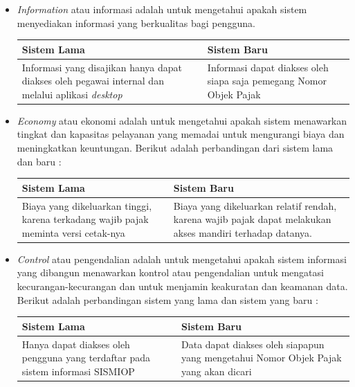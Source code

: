 \documentclass[pdftex,12pt, oneside]{article}
\begin{document}
\begin{enumerate}
\begin{itemize}
\item \textit{Information} atau informasi adalah untuk mengetahui apakah sistem menyediakan informasi yang berkualitas bagi pengguna. 

\begin{table}
	\centering
	\begin{tabular}{| p{7cm} | p{7cm} |}
		\hline
		Sistem Lama & Sistem Baru \\
		\hline
		Informasi yang disajikan hanya dapat diakses oleh pegawai internal dan melalui aplikasi \textit{desktop} & Informasi dapat diakses oleh siapa saja pemegang Nomor Objek Pajak \\
		\hline
	\end{tabular}
\end{table}

\item \textit{Economy} atau ekonomi adalah untuk mengetahui apakah sistem menawarkan tingkat dan kapasitas pelayanan yang memadai untuk mengurangi biaya dan meningkatkan keuntungan. Berikut adalah perbandingan dari sistem lama dan baru :

\begin{table}	
	\centering
	\begin{tabular}{| p{7cm} | p{7cm} |}
		\hline 
		Sistem Lama & Sistem Baru \\
		\hline
		Biaya yang dikeluarkan tinggi, karena terkadang wajib pajak meminta versi cetak-nya & Biaya yang dikeluarkan relatif rendah, karena wajib pajak dapat melakukan akses mandiri terhadap datanya. \\
		\hline		
	\end{tabular}
\end{table}

\item \textit{Control} atau pengendalian adalah untuk mengetahui apakah sistem informasi yang dibangun menawarkan kontrol atau pengendalian untuk mengatasi kecurangan-kecurangan dan untuk menjamin keakuratan dan keamanan data. Berikut adalah perbandingan sistem yang lama dan sistem yang baru :

\begin{table}[H]
	\centering
	\begin{tabular}{| p{7cm} | p{7cm} |}
	 	\hline
		Sistem Lama & Sistem Baru \\
		\hline
		Hanya dapat diakses oleh pengguna yang terdaftar pada sistem informasi SISMIOP & Data dapat diakses oleh siapapun yang mengetahui Nomor Objek Pajak yang akan dicari \\
		\hline
	\end{tabular}
\end{table}


\end{itemize}
\end{enumerate}
\end{document}
